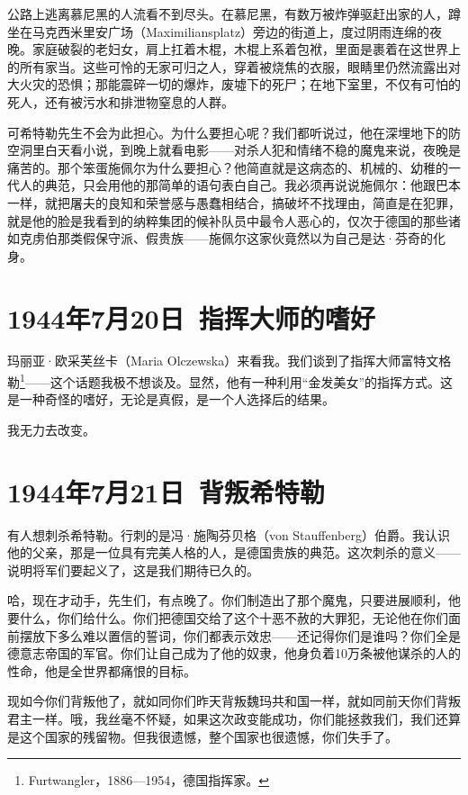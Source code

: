 \documentclass[UTF8]{ctexart}
\begin{document}
公路上逃离慕尼黑的人流看不到尽头。在慕尼黑，有数万被炸弹驱赶出家的人，蹲坐在马克西米里安广场（Maximiliansplatz）旁边的街道上，度过阴雨连绵的夜晚。家庭破裂的老妇女，肩上扛着木棍，木棍上系着包袱，里面是裹着在这世界上的所有家当。这些可怜的无家可归之人，穿着被烧焦的衣服，眼睛里仍然流露出对大火灾的恐惧；那能震碎一切的爆炸，废墟下的死尸；在地下室里，不仅有可怕的死人，还有被污水和排泄物窒息的人群。

可希特勒先生不会为此担心。为什么要担心呢？我们都听说过，他在深埋地下的防空洞里白天看小说，到晚上就看电影——对杀人犯和情绪不稳的魔鬼来说，夜晚是痛苦的。那个笨蛋施佩尔为什么要担心？他简直就是这病态的、机械的、幼稚的一代人的典范，只会用他的那简单的语句表白自己。我必须再说说施佩尔：他跟巴本一样，就把屠夫的良知和荣誉感与愚蠢相结合，搞破坏不找理由，简直是在犯罪，就是他的脸是我看到的纳粹集团的候补队员中最令人恶心的，仅次于德国的那些诸如克虏伯那类假保守派、假贵族——施佩尔这家伙竟然以为自己是达·芬奇的化身。

\section{1944年7月20日\ 指挥大师的嗜好}

玛丽亚·欧采芙丝卡（Maria Olczewska）来看我。我们谈到了指挥大师富特文格勒\footnote{Furtwangler，1886—1954，德国指挥家。}——这个话题我极不想谈及。显然，他有一种利用“金发美女”的指挥方式。这是一种奇怪的嗜好，无论是真假，是一个人选择后的结果。

我无力去改变。

\section{1944年7月21日\ 背叛希特勒}

有人想刺杀希特勒。行刺的是冯·施陶芬贝格（von Stauffenberg）伯爵。我认识他的父亲，那是一位具有完美人格的人，是德国贵族的典范。这次刺杀的意义——说明将军们要起义了，这是我们期待已久的。

哈，现在才动手，先生们，有点晚了。你们制造出了那个魔鬼，只要进展顺利，他要什么，你们给什么。你们把德国交给了这个十恶不赦的大罪犯，无论他在你们面前摆放下多么难以置信的誓词，你们都表示效忠——还记得你们是谁吗？你们全是德意志帝国的军官。你们让自己成为了他的奴隶，他身负着10万条被他谋杀的人的性命，他是全世界都痛恨的目标。

现如今你们背叛他了，就如同你们昨天背叛魏玛共和国一样，就如同前天你们背叛君主一样。哦，我丝毫不怀疑，如果这次政变能成功，你们能拯救我们，我们还算是这个国家的残留物。但我很遗憾，整个国家也很遗憾，你们失手了。
\end{document}
